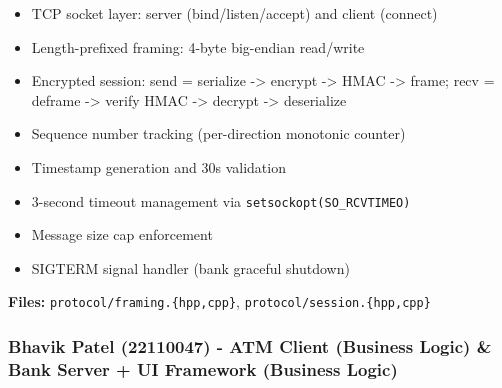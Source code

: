 \documentclass[
]{article}
\providecommand{\tightlist}{%
  \setlength{\itemsep}{0pt}\setlength{\parskip}{0pt}}
\begin{document}
\begin{itemize}
\tightlist
\item
  TCP socket layer: server (bind/listen/accept) and client (connect)
\item
  Length-prefixed framing: 4-byte big-endian read/write
\item
  Encrypted session: send = serialize -\textgreater{} encrypt
  -\textgreater{} HMAC -\textgreater{} frame; recv = deframe
  -\textgreater{} verify HMAC -\textgreater{} decrypt -\textgreater{}
  deserialize
\item
  Sequence number tracking (per-direction monotonic counter)
\item
  Timestamp generation and 30s validation
\item
  3-second timeout management via \texttt{setsockopt(SO\_RCVTIMEO)}
\item
  Message size cap enforcement
\item
  SIGTERM signal handler (bank graceful shutdown)
\end{itemize}

\textbf{Files:} \texttt{protocol/framing.\{hpp,cpp\}},
\texttt{protocol/session.\{hpp,cpp\}}

\hypertarget{bhavik-patel-22110047---bank-server-business-logic}{%
\subsubsection{Bhavik Patel (22110047) - ATM Client (Business Logic)
\& Bank Server + UI Framework (Business
Logic)}\label{bhavik-patel-22110047---bank-server-business-logic}}
\end{document}
